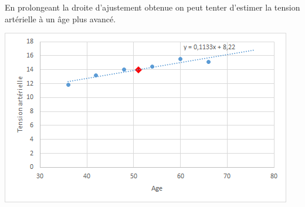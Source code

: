 \begin{myex}
	
	En prolongeant la droite d'ajustement obtenue on peut tenter d'estimer la tension artérielle à un âge plus avancé.
	
	\begin{center}
		\includegraphics[scale =0.7]{./img/ex3}		
	\end{center}
		
\end{myex}
